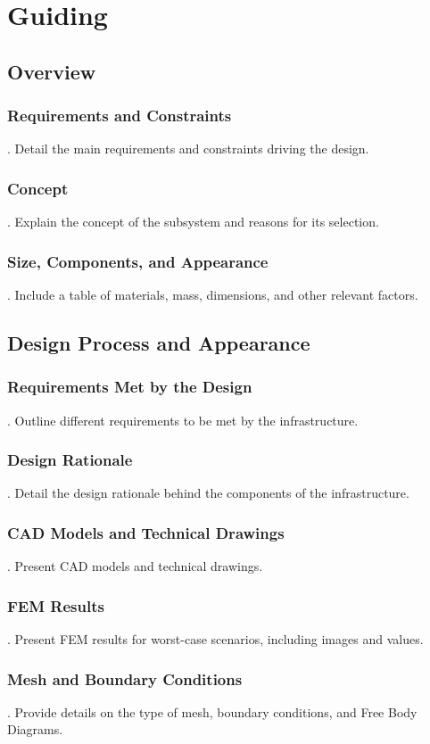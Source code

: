 \section{Guiding}
\subsection{Overview}
\subsubsection{Requirements and Constraints}
.  Detail the main requirements and constraints driving the design.
\subsubsection{Concept}
.  Explain the concept of the subsystem and reasons for its selection.
\subsubsection{Size, Components, and Appearance}
.  Include a table of materials, mass, dimensions, and other relevant factors.

\subsection{Design Process and Appearance}
\subsubsection{Requirements Met by the Design}
.  Outline different requirements to be met by the infrastructure.
\subsubsection{Design Rationale}
.  Detail the design rationale behind the components of the infrastructure.
\subsubsection{CAD Models and Technical Drawings}
.  Present CAD models and technical drawings.
\subsubsection{FEM Results}
.  Present FEM results for worst-case scenarios, including images and values.
\subsubsection{Mesh and Boundary Conditions}
.  Provide details on the type of mesh, boundary conditions, and Free Body Diagrams.
